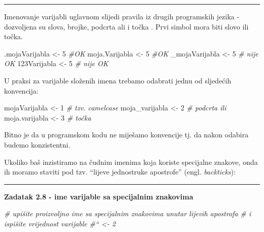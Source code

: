 \documentclass[]{book}
\newenvironment{Shaded}{\begin{snugshade}}{\end{snugshade}}
\newcommand{\DecValTok}[1]{\textcolor[rgb]{0.00,0.00,0.81}{#1}}
\newcommand{\StringTok}[1]{\textcolor[rgb]{0.31,0.60,0.02}{#1}}
\newcommand{\CommentTok}[1]{\textcolor[rgb]{0.56,0.35,0.01}{\textit{#1}}}
\newcommand{\NormalTok}[1]{#1}
\theoremstyle{definition}
\theoremstyle{definition}
\theoremstyle{definition}
\theoremstyle{remark}
\begin{document}
\begin{center}\rule{0.5\linewidth}{\linethickness}\end{center}

Imenovanje varijabli uglavnom slijedi pravila iz drugih programskih
jezika - dozvoljena su slova, brojke, podcrta ali i točka . Prvi simbol
mora biti slovo ili točka.

\begin{Shaded}
\begin{Highlighting}[]
\NormalTok{.mojaVarijabla <-}\StringTok{ }\DecValTok{5}   \CommentTok{#OK}
\NormalTok{moja.Varijabla <-}\StringTok{ }\DecValTok{5}  \CommentTok{#OK}
\NormalTok{_mojaVarijabla <-}\StringTok{ }\DecValTok{5}  \CommentTok{# nije OK}
\NormalTok{123Varijabla <-}\StringTok{ }\DecValTok{5}  \CommentTok{# nije OK}
\end{Highlighting}
\end{Shaded}

U praksi za varijable složenih imena trebamo odabrati jednu od sljedećih
konvencija:

\begin{Shaded}
\begin{Highlighting}[]
\NormalTok{mojaVarijabla <-}\StringTok{ }\DecValTok{1}    \CommentTok{# tzv. camelcase}
\NormalTok{moja_varijabla <-}\StringTok{ }\DecValTok{2}   \CommentTok{#  podcrta ili}
\NormalTok{moja.varijabla <-}\StringTok{ }\DecValTok{3}   \CommentTok{# točka}
\end{Highlighting}
\end{Shaded}

Bitno je da u programskom kodu ne miješamo konvencije tj. da nakon
odabira budemo konzistentni.

Ukoliko baš inzistiramo na čudnim imenima koja koriste specijalne
znakove, onda ih moramo staviti pod tzv. ``lijeve jednostruke
apostrofe'' (engl. \emph{backticks}):

\begin{center}\rule{0.5\linewidth}{\linethickness}\end{center}

\textbf{Zadatak 2.8 - ime varijable sa specijalnim znakovima}

\begin{Shaded}
\begin{Highlighting}[]
\CommentTok{# upišite proizvoljno ime sa specijalnim znakovima unutar lijevih apostrofa }
\CommentTok{# i ispišite vrijednost varijable}
\CommentTok{#`` <- 2               }
\end{Highlighting}
\end{Shaded}
\end{document}
